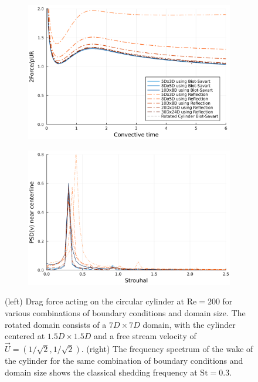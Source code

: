\documentclass[final,1p,times]{elsarticle}
\begin{document}
\begin{figure}
    \centering
    \begin{subfigure}{.5\textwidth}
        \centering
        \includegraphics[width=\textwidth]{tex//fig/force.png}
    \end{subfigure}%
    \begin{subfigure}{.5\textwidth}
        \centering
        \includegraphics[width=\textwidth]{tex/fig/fft.png}
    \end{subfigure}%
    \caption{(left) Drag force acting on the circular cylinder at $\text{Re}=200$ for various combinations of boundary conditions and domain size. The rotated domain consists of a $7D\times7D$ domain, with the cylinder centered at $1.5D\times1.5D$ and a free stream velocity of $\vec{U}=(1/\sqrt2,1/\sqrt2)$. (right) The frequency spectrum of the wake of the cylinder for the same combination of boundary conditions and domain size shows the classical shedding frequency at $\text{St}=0.3$.}
    \label{fig:cylinder_force}
\end{figure}
\end{document}
